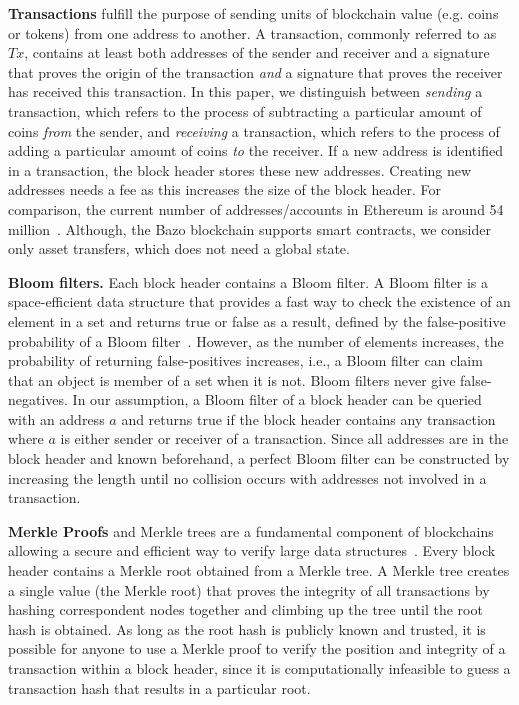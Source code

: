 \documentclass[conference]{IEEEtran}
\begin{document}
\textbf{Transactions} fulfill the purpose of sending units of blockchain value (e.g. coins or tokens) from one address to another. A transaction, commonly referred to as $Tx$, contains at least both addresses of the sender and receiver and a signature that proves the origin of the transaction \textit{and} a signature that proves the receiver has received this transaction. In this paper, we distinguish between \textit{sending} a transaction, which refers to the process of subtracting a particular amount of coins \textit{from} the sender, and \textit{receiving} a transaction, which refers to the process of adding a particular amount of coins \textit{to} the receiver. If a new address is identified in a transaction, the block header stores these new addresses. Creating new addresses needs a fee as this increases the size of the block header. For comparison, the current number of addresses/accounts in Ethereum is around 54 million~\cite{Acc}. Although, the Bazo blockchain supports smart contracts, we consider only asset transfers, which does not need a global state.

\textbf{Bloom filters.} Each block header contains a Bloom filter. A Bloom filter is a space-efficient data structure that provides a fast way to check the existence of an element in a set and returns true or false as a result, defined by the false-positive probability of a Bloom filter~\cite{BloomFilter}. However, as the number of elements increases, the probability of returning false-positives increases, i.e., a Bloom filter can claim that an object is member of a set when it is not. Bloom filters never give false-negatives. In our assumption, a Bloom filter of a block header can be queried with an address $a$ and returns true if the block header contains any transaction where $a$ is either sender or receiver of a transaction. Since all addresses are in the block header and known beforehand, a perfect Bloom filter can be constructed by increasing the length until no collision occurs with addresses not involved in a transaction.

\textbf{Merkle Proofs} and Merkle trees are a fundamental component of blockchains allowing a secure and efficient way to verify large data structures~\cite{MerkleTree}. Every block header contains a Merkle root obtained from a Merkle tree. A Merkle tree creates a single value (the Merkle root) that proves the integrity of all transactions by hashing correspondent nodes together and climbing up the tree until the root hash is obtained. As long as the root hash is publicly known and trusted, it is possible for anyone to use a Merkle proof to verify the position and integrity of a transaction within a block header, since it is computationally infeasible to guess a transaction hash that results in a particular root.
\end{document}
